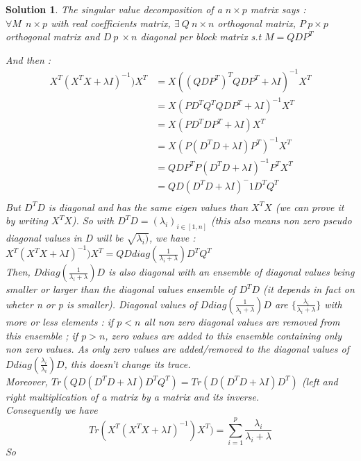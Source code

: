 \documentclass[12pt,a4paper]{article}
\newtheorem{solution}{Solution}
\begin{document}
\begin{solution}
The singular value decomposition of a $n \times p$ matrix says :\\ $\forall M\ \ n \times p $ with real coefficients matrix, $\exists\ Q\ n \times n$ orthogonal matrix, $P\ p \times p$ orthogonal matrix and $D\ p\ \times n$ diagonal per block matrix s.t $M = QDP^T$

And then : \\
\begin{equation}
\begin{split}
X^T(X^T X + \lambda I)^{-1})X^T & = X((QDP^T)^T QDP^T + \lambda I)^{-1}X^T \\
& = X(P D^T Q^T Q D P^T + \lambda I)^{-1}X^T \\
& = X(P D^T D P^T + \lambda I)X^T\\
& = X(P(D^T D + \lambda I)P^T)^{-1}X^T\\
& = Q D P^T P(D^T D + \lambda I)^{-1}P^T X^T\\
& = Q D(D^T D + \lambda I)^-1 D^T Q^T\\
\end{split}
\end{equation} 
But $D^T D$ is diagonal and has the same eigen values than $X^T X$ (we can prove it by writing $X^T X$). So with $D^T D = (\lambda_i)_{i \in [1,n]}$ (this also means non zero pseudo diagonal values in D will be $\sqrt{\lambda_i)}$, we have : $X^T(X^T X + \lambda I)^{-1})X^T = QDdiag(\frac{1}{\lambda_i + \lambda})D^T Q^T$\\

Then, $Ddiag(\frac{1}{\lambda_i + \lambda})D$ is also diagonal with an ensemble of diagonal values being smaller or larger than the diagonal values ensemble of $D^T D$ (it depends in fact on wheter n or p is smaller). Diagonal values of $Ddiag(\frac{1}{\lambda_i + \lambda})D$ are $\{\frac{\lambda_i}{\lambda_i + \lambda}\}$ with more or less elements : if $p < n$ all non zero diagonal values are removed from this ensemble ; if $p > n$, zero values are added to this ensemble containing only non zero values. As only zero values are added/removed to the diagonal values of $Ddiag(\frac{\lambda_i}{\lambda_i})D$, this doesn't change its trace.\\

 Moreover, $Tr(QD(D^TD + \lambda I)D^TQ^T) = Tr(D(D^TD + \lambda I)D^T)$ (left and right multiplication of a matrix by a matrix and its inverse.\\
 
 Consequently we have $$ \boxed{Tr(X^T(X^T X + \lambda I)^{-1})X^T) = \sum_{i=1}^p \frac{\lambda_i}{\lambda_i + \lambda}}$$ 
So
\end{solution}
\end{document}
